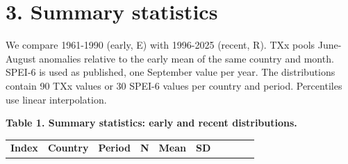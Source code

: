 \documentclass[
  10pt,
]{article}
\newcounter{none} %
\begin{document}
\section{3. Summary statistics}\label{summary-statistics}

We compare 1961-1990 (early, E) with 1996-2025 (recent, R). TXx pools
June-August anomalies relative to the early mean of the same country and
month. SPEI-6 is used as published, one September value per year. The
distributions contain 90 TXx values or 30 SPEI-6 values per country and
period. Percentiles use linear interpolation.

\textbf{Table 1. Summary statistics: early and recent distributions.}

{\def\LTcaptype{none} %
\begin{longtable}[]{@{}
  >{\centering\arraybackslash}p{}
  >{\centering\arraybackslash}p{}
  >{\centering\arraybackslash}p{}
  >{\centering\arraybackslash}p{}
  >{\centering\arraybackslash}p{}
  >{\centering\arraybackslash}p{}
  >{\centering\arraybackslash}p{}
  >{\centering\arraybackslash}p{}
  >{\centering\arraybackslash}p{}
  >{\centering\arraybackslash}p{}@{}}
\toprule\noalign{}
\begin{minipage}[b]{\linewidth}\centering
\textbf{Index}
\end{minipage} & \begin{minipage}[b]{\linewidth}\centering
\textbf{Country}
\end{minipage} & \begin{minipage}[b]{\linewidth}\centering
\textbf{Period}
\end{minipage} & \begin{minipage}[b]{\linewidth}\centering
\textbf{N}
\end{minipage} & \begin{minipage}[b]{\linewidth}\centering
\textbf{Mean}
\end{minipage} & \begin{minipage}[b]{\linewidth}\centering
\textbf{SD}
\end{minipage} & \begin{minipage}[b]{\linewidth}\centering

\end{minipage}
\end{longtable}}
\end{document}
